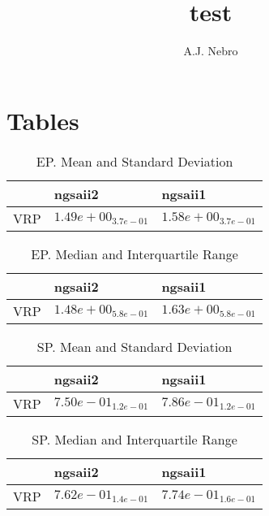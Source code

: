 \documentclass{article}
\title{test}
\author{A.J. Nebro}
\begin{document}
\maketitle
\section{Tables}

\begin{table}
\caption{EP. Mean and Standard Deviation}
\label{table: EP}
\centering
\begin{scriptsize}
\begin{tabular}{lll}
\hline & ngsaii2 &  ngsaii1\\
\hline 
VRP & \cellcolor{gray95}$  1.49e+00_{ 3.7e-01}$ & \cellcolor{gray25}$  1.58e+00_{ 3.7e-01}$ \\
\hline
\end{tabular}
\end{scriptsize}
\end{table}

\begin{table}
\caption{EP. Median and Interquartile Range}
\label{table: EP}
\centering
\begin{scriptsize}
\begin{tabular}{lll}
\hline & ngsaii2 &  ngsaii1\\
\hline 
VRP & \cellcolor{gray95}$  1.48e+00_{ 5.8e-01}$ & \cellcolor{gray25}$  1.63e+00_{ 5.8e-01}$ \\
\hline
\end{tabular}
\end{scriptsize}
\end{table}

\begin{table}
\caption{SP. Mean and Standard Deviation}
\label{table: SP}
\centering
\begin{scriptsize}
\begin{tabular}{lll}
\hline & ngsaii2 &  ngsaii1\\
\hline 
VRP & \cellcolor{gray95}$  7.50e-01_{ 1.2e-01}$ & \cellcolor{gray25}$  7.86e-01_{ 1.2e-01}$ \\
\hline
\end{tabular}
\end{scriptsize}
\end{table}

\begin{table}
\caption{SP. Median and Interquartile Range}
\label{table: SP}
\centering
\begin{scriptsize}
\begin{tabular}{lll}
\hline & ngsaii2 &  ngsaii1\\
\hline 
VRP & \cellcolor{gray95}$  7.62e-01_{ 1.4e-01}$ & \cellcolor{gray25}$  7.74e-01_{ 1.6e-01}$ \\
\hline
\end{tabular}
\end{scriptsize}
\end{table}
\end{document}
